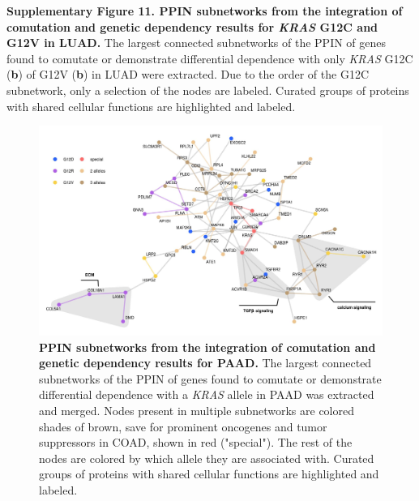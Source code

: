 \documentclass[english, 10pt, letterpaper]{article}
\newcommand{\KRAS}{\emph{KRAS}}
\begin{document}
\newpage
\noindent \textbf{Supplementary Figure 11. PPIN subnetworks from the integration of comutation and genetic dependency results for \KRAS{} G12C and G12V in LUAD.}
The largest connected subnetworks of the PPIN of genes found to comutate or demonstrate differential dependence with only \KRAS{} G12C (\textbf{b}) of G12V (\textbf{b}) in LUAD were extracted. Due to the order of the G12C subnetwork, only a selection of the nodes are labeled. Curated groups of proteins with shared cellular functions are highlighted and labeled.
\newpage


\begin{figure}[h!]
\centering
\includegraphics[width=180mm]{figures/Supp_Fig_12.jpeg}
\caption{
    \textbf{PPIN subnetworks from the integration of comutation and genetic dependency results for PAAD.}
    The largest connected subnetworks of the PPIN of genes found to comutate or demonstrate differential dependence with a \KRAS{} allele in PAAD was extracted and merged. Nodes present in multiple subnetworks are colored shades of brown, save for prominent oncogenes and tumor suppressors in COAD, shown in red ("special"). The rest of the nodes are colored by which allele they are associated with. Curated groups of proteins with shared cellular functions are highlighted and labeled.
}
\label{sfig:paad-integrated-ppin}
\end{figure}



\end{document}

